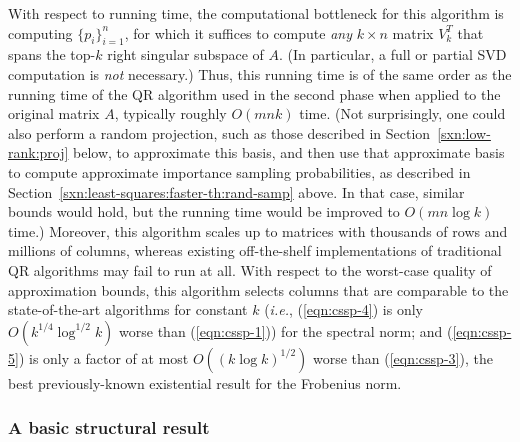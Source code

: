 \documentclass[twoside]{article}
\begin{document}
With respect to running time, the computational bottleneck for this 
algorithm is computing $\{p_i\}_{i=1}^{n}$, for which it suffices to 
compute \emph{any} $k \times n$ matrix $V_k^T$ that spans the top-$k$ right 
singular subspace of $A$.
(In particular, a full or partial SVD computation is \emph{not} necessary.)
Thus, this running time is of the same order as the running time of the QR 
algorithm used in the second phase when applied to the original matrix $A$, 
typically roughly $O(mnk)$ time.
(Not surprisingly, one could also perform a random projection, such as 
those described in Section~\ref{sxn:low-rank:proj} below, to approximate 
this basis, and then use that approximate basis to compute approximate 
importance sampling probabilities, as described in 
Section~\ref{sxn:least-squares:faster-th:rand-samp} above.  In that case, 
similar bounds would hold, but the running time would be improved to 
$O(mn \log k)$ time.)
Moreover, this algorithm scales up to matrices with thousands of rows and 
millions of columns, whereas existing off-the-shelf implementations of 
traditional QR algorithms may fail to run at all.
With respect to the worst-case quality of approximation bounds, this 
algorithm selects columns that are comparable to the state-of-the-art 
algorithms for constant $k$ (\emph{i.e.}, (\ref{eqn:cssp-4}) is only
$O(k^{1/4}\log^{1/2}k)$ worse than (\ref{eqn:cssp-1})) for the spectral norm; 
and (\ref{eqn:cssp-5}) is only a factor of at most $O((k \log k)^{1/2})$ 
worse than (\ref{eqn:cssp-3}), the best previously-known existential result 
for the Frobenius norm.



\subsubsection{A basic structural result}
\end{document}
